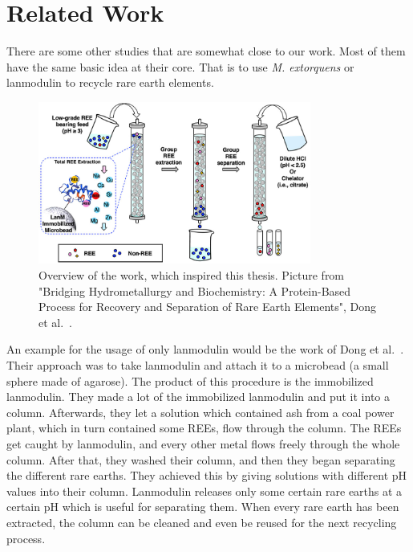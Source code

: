 \chapter{Related Work\authorA{}}

There are some other studies that are somewhat close to our work.
Most of them have the same basic idea at their core.
That is to use \emph{M. extorquens} or lanmodulin to recycle rare earth elements.

\begin{figure}[H]
    \centering
    \includegraphics[width=0.8\textwidth]{./media/images/original_study_process}
    \caption{Overview of the work, which inspired this thesis.
    Picture from "Bridging Hydrometallurgy and Biochemistry:
    A Protein-Based Process for Recovery and Separation of Rare Earth Elements", Dong et al.~\cite{originalstudy}.}
    \label{fig:original_study_process}
\end{figure}

An example for the usage of only lanmodulin would be the work of Dong et al.~\cite{originalstudy}.
Their approach was to take lanmodulin and attach it to a microbead (a small sphere made of agarose).
The product of this procedure is the immobilized lanmodulin.
They made a lot of the immobilized lanmodulin and put it into a column.
Afterwards, they let a solution which contained ash from a coal power plant, which in turn contained some REEs, flow through the column.
The REEs get caught by lanmodulin, and every other metal flows freely through the whole column.
After that, they washed their column, and then they began separating the different rare earths.
They achieved this by giving solutions with different pH values into their column.
Lanmodulin releases only some certain rare earths at a certain pH which is useful for separating them.
When every rare earth has been extracted, the column can be cleaned and even be reused for the next recycling process.

